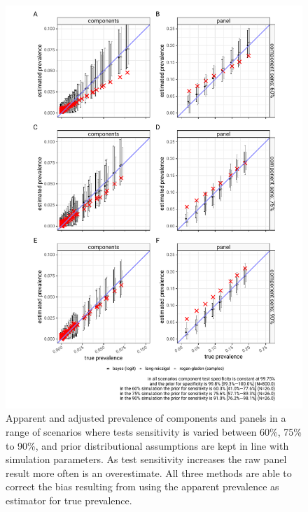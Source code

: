 \documentclass[a4paper, 12pt, twoside]{article}
\begin{document}
\begin{figure}[h!]
\centering
  \includegraphics{fig/simulation_result_same_sens_v2}
  \caption{Apparent and adjusted prevalence of components and panels in a range of scenarios where tests sensitivity is varied between 60\%, 75\% to 90\%, and prior distributional assumptions are kept in line with simulation parameters. As test sensitivity increases the raw panel result more often is an overestimate. All three methods are able to correct the bias resulting from using the apparent prevalence as estimator for true prevalence.}
\label{fig:B4}
\end{figure}
\end{document}
